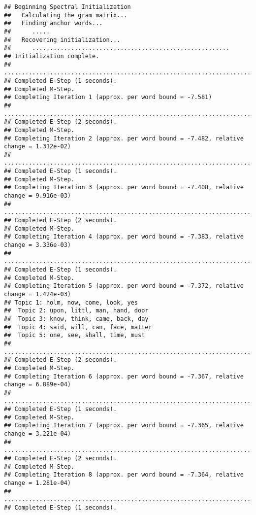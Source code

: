 \documentclass[
]{book}
\begin{document}
\begin{verbatim}
## Beginning Spectral Initialization 
##   Calculating the gram matrix...
##   Finding anchor words...
##      .....
##   Recovering initialization...
##      ........................................................
## Initialization complete.
## ....................................................................................................
## Completed E-Step (1 seconds). 
## Completed M-Step. 
## Completing Iteration 1 (approx. per word bound = -7.581) 
## ....................................................................................................
## Completed E-Step (2 seconds). 
## Completed M-Step. 
## Completing Iteration 2 (approx. per word bound = -7.482, relative change = 1.312e-02) 
## ....................................................................................................
## Completed E-Step (1 seconds). 
## Completed M-Step. 
## Completing Iteration 3 (approx. per word bound = -7.408, relative change = 9.916e-03) 
## ....................................................................................................
## Completed E-Step (2 seconds). 
## Completed M-Step. 
## Completing Iteration 4 (approx. per word bound = -7.383, relative change = 3.336e-03) 
## ....................................................................................................
## Completed E-Step (1 seconds). 
## Completed M-Step. 
## Completing Iteration 5 (approx. per word bound = -7.372, relative change = 1.424e-03) 
## Topic 1: holm, now, come, look, yes 
##  Topic 2: upon, littl, man, hand, door 
##  Topic 3: know, think, came, back, day 
##  Topic 4: said, will, can, face, matter 
##  Topic 5: one, see, shall, time, must 
## ....................................................................................................
## Completed E-Step (2 seconds). 
## Completed M-Step. 
## Completing Iteration 6 (approx. per word bound = -7.367, relative change = 6.889e-04) 
## ....................................................................................................
## Completed E-Step (1 seconds). 
## Completed M-Step. 
## Completing Iteration 7 (approx. per word bound = -7.365, relative change = 3.221e-04) 
## ....................................................................................................
## Completed E-Step (2 seconds). 
## Completed M-Step. 
## Completing Iteration 8 (approx. per word bound = -7.364, relative change = 1.281e-04) 
## ....................................................................................................
## Completed E-Step (1 seconds). 

\end{verbatim}
\end{document}
